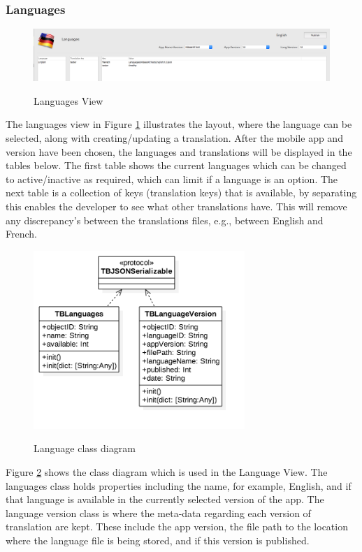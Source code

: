 \subsubsection{Languages}

\begin{figure}[!h]
    \caption{Languages View}
    \centering
    \includegraphics[width=120mm]{images/dashboard/languages}
    \label{fig:languages}
\end{figure} 

The languages view in Figure \ref{fig:languages} illustrates the layout, where the language can be selected, along with creating/updating a translation. After the mobile app and version have been chosen, the languages and translations will be displayed in the tables below. The first table shows the current languages which can be changed to active/inactive as required, which can limit if a language is an option. The next table is a collection of keys (translation keys) that is available, by separating this enables the developer to see what other translations have. This will remove any discrepancy’s between the translations files, e.g., between English and French.

\begin{figure}[!h]
    \caption{Language class diagram}
    \centering
    \includegraphics[width=80mm]{images/classdiagrams/lang_class}
    \label{fig:lang_class}
\end{figure}

Figure \ref{fig:lang_class} shows the class diagram which is used in the Language View. The languages class holds properties including the name, for example, English, and if that language is available in the currently selected version of the app. The language version class is where the meta-data regarding each version of translation are kept. These include the app version, the file path to the location where the language file is being stored, and if this version is published.

